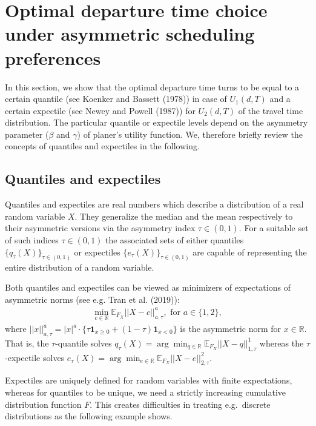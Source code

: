 \documentclass[
]{article}
\theoremstyle{definition}
\theoremstyle{definition}
\theoremstyle{definition}
\theoremstyle{definition}
\theoremstyle{remark}
\begin{document}
\hypertarget{optimal-departure-time-choice-under-asymmetric-scheduling-preferences}{%
\section{Optimal departure time choice under asymmetric scheduling preferences}\label{optimal-departure-time-choice-under-asymmetric-scheduling-preferences}}

In this section, we show that the optimal departure time turns to be equal to a certain quantile (see Koenker and Bassett (1978)) in case of \(U_1(d,T)\) and a certain expectile (see Newey and Powell (1987)) for \(U_2(d,T)\) of the travel time distribution. The particular quantile or expectile levels depend on the asymmetry parameter (\(\beta\) and \(\gamma\)) of planer's utility function. We, therefore briefly review the concepts of quantiles and expectiles in the following.

\hypertarget{quantiles-and-expectiles}{%
\subsection{Quantiles and expectiles}\label{quantiles-and-expectiles}}

Quantiles and expectiles are real numbers which describe a distribution of a real random variable \(X\). They generalize the median and the mean respectively to their asymmetric versions via the asymmetry index \(\tau\in(0,1)\). For a suitable set of such indices \(\tau\in(0,1)\) the associated sets of either quantiles \(\{q_\tau(X)\}_{\tau\in(0,1)}\) or expectiles \(\{e_\tau(X)\}_{\tau\in(0,1)}\) are capable of representing the entire distribution of a random variable.

Both quantiles and expectiles can be viewed as minimizers of expectations of asymmetric norms (see e.g. Tran et al. (2019)):
\begin{align}
\min_{c\in\mathbb R}\mathbb E_{F_X}||X-c||^a_{a,\tau}, \text{ for } a\in\{1,2\}, \label{eq:asnorm}
\end{align}
where \(||x||^a_{a,\tau}=|x|^a\cdot\{\tau\mathbf 1_{x\geq 0}+(1-\tau)\mathbf 1_{x<0}\}\) is the asymmetric norm for \(x\in\mathbb R\).
That is, the \(\tau\)-quantile solves \(q_\tau(X) = \arg\min_{q\in\mathbb R}\mathbb E_{F_X}||X-q||^1_{1,\tau}\) whereas the \(\tau\)-expectile solves \(e_\tau(X) = \arg\min_{e\in\mathbb R}\mathbb E_{F_X}||X-e||^2_{2,\tau}\).

Expectiles are uniquely defined for random variables with finite expectations, whereas for quantiles to be unique, we need a strictly increasing cumulative distribution function \(F\). This creates difficulties in treating e.g.~discrete distributions as the following example shows.
\end{document}
